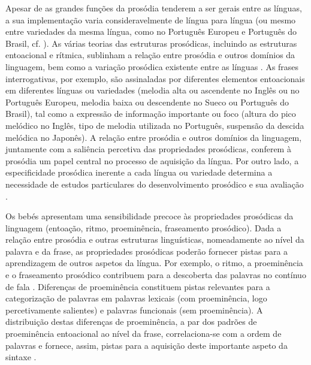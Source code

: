 \documentclass[output=paper,colorlinks,citecolor=brown,booklanguage=portuguese]{langscibook}
\begin{document}
Apesar de as grandes funções da prosódia tenderem a ser gerais entre as línguas, a sua implementação varia consideravelmente de língua para língua (ou mesmo entre variedades da mesma língua, como no Português Europeu e Português do Brasil, cf. \citealp{Frota2016}). As várias teorias das estruturas prosódicas, incluindo as estruturas entoacional e rítmica, sublinham a relação entre prosódia e outros domínios da linguagem, bem como a variação prosódica existente entre as línguas \citep{Frota2012, Frota2018a}. As frases interrogativas, por exemplo, são assinaladas por diferentes elementos entoacionais em diferentes línguas ou variedades (melodia alta ou ascendente no Inglês ou no Português Europeu, melodia baixa ou descendente no Sueco ou Português do Brasil), tal como a expressão de informação importante ou foco (altura do pico melódico no Inglês, tipo de melodia utilizada no Português, suspensão da descida melódica no Japonês). A relação entre prosódia e outros domínios da linguagem, juntamente com a saliência percetiva das propriedades prosódicas, conferem à prosódia um papel central no processo de aquisição da língua. Por outro lado, a especificidade prosódica inerente a cada língua ou variedade determina a necessidade de estudos particulares do desenvolvimento prosódico e sua avaliação \citep{Prieto2018}. 

Os bebés apresentam uma sensibilidade precoce às propriedades prosódicas da linguagem (entoação, ritmo, proeminência, fraseamento prosódico). Dada a relação entre prosódia e outras estruturas linguísticas, nomeadamente ao nível da palavra e da frase, as propriedades prosódicas poderão fornecer pistas para a aprendizagem de outros aspetos da língua. Por exemplo, o ritmo, a proeminência e o fraseamento prosódico contribuem para a descoberta das palavras no contínuo de fala \citep{Nazzi2006, Butler2018}. Diferenças de proeminência constituem pistas relevantes para a categorização de palavras em palavras lexicais (com proeminência, logo percetivamente salientes) e palavras funcionais (sem proeminência). A distribuição destas diferenças de proeminência, a par dos padrões de proeminência entoacional ao nível da frase, correlaciona-se com a ordem de palavras e fornece, assim, pistas para a aquisição deste importante aspeto da sintaxe \citep{Christophe2008, Bernard2012}.
\end{document}
